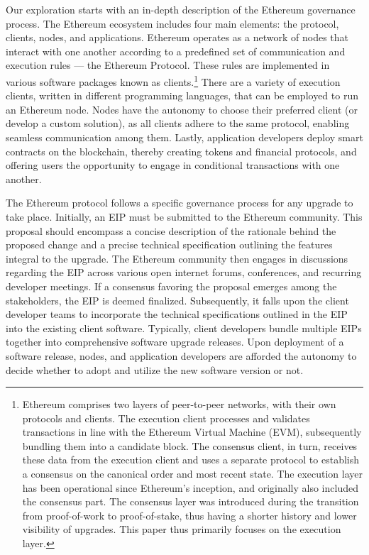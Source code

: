 \documentclass[No]{AEA}
\begin{document}
Our exploration starts with an in-depth description of the Ethereum governance process. The Ethereum ecosystem includes four main elements: the protocol, clients, nodes, and applications. Ethereum operates as a network of nodes that interact with one another according to a predefined set of communication and execution rules — the Ethereum Protocol. These rules are implemented in various software packages known as clients.\footnote{Ethereum comprises two layers of peer-to-peer networks, with their own protocols and clients. The execution client processes and validates transactions in line with the Ethereum Virtual Machine (EVM), subsequently bundling them into a candidate block. The consensus client, in turn, receives these data from the execution client and uses a separate protocol to establish a consensus on the canonical order and most recent state.  The execution layer has been operational since Ethereum's inception, and originally also included the consensus part. The consensus layer was introduced during the transition from proof-of-work to proof-of-stake, thus having a shorter history and lower visibility of upgrades. This paper thus primarily focuses on the execution layer.} There are a variety of execution clients, written in different programming languages, that can be employed to run an Ethereum node. Nodes have the autonomy to choose their preferred client (or develop a custom solution), as all clients adhere to the same protocol, enabling seamless communication among them. Lastly, application developers deploy smart contracts on the blockchain, thereby creating tokens and financial protocols, and offering users the opportunity to engage in conditional transactions with one another.

The Ethereum protocol follows a specific governance process for any upgrade to take place. Initially, an EIP must be submitted to the Ethereum community. This proposal should encompass a concise description of the rationale behind the proposed change and a precise technical specification outlining the features integral to the upgrade. The Ethereum community then engages in discussions regarding the EIP across various open internet forums, conferences, and recurring developer meetings. If a consensus favoring the proposal emerges among the stakeholders, the EIP is deemed finalized. Subsequently, it falls upon the client developer teams to incorporate the technical specifications outlined in the EIP into the existing client software. Typically, client developers bundle multiple EIPs together into comprehensive software upgrade releases. Upon deployment of a software release, nodes, and application developers are afforded the autonomy to decide whether to adopt and utilize the new software version or not. 
\end{document}
